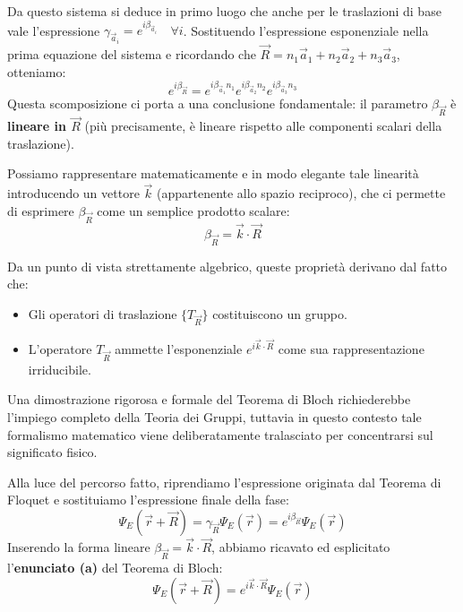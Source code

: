 Da questo sistema si deduce in primo luogo che anche per le traslazioni di base vale l'espressione \(\gamma_{\vec{a}_i} = e^{i\beta_{\vec{a}_i}} \quad \forall i\).
Sostituendo l'espressione esponenziale nella prima equazione del sistema e ricordando che \(\vec{R} = n_1\vec{a}_1 + n_2\vec{a}_2 + n_3\vec{a}_3\), otteniamo:
\begin{equation}
    e^{i\beta_{\vec{R}}} = e^{i\beta_{\vec{a}_1}n_1} e^{i\beta_{\vec{a}_2}n_2} e^{i\beta_{\vec{a}_3}n_3}
\end{equation}
Questa scomposizione ci porta a una conclusione fondamentale: il parametro \(\beta_{\vec{R}}\) è \textbf{lineare in \(\vec{R}\)} (più precisamente, è lineare rispetto alle componenti scalari della traslazione).

Possiamo rappresentare matematicamente e in modo elegante tale linearità introducendo un vettore \(\vec{k}\) (appartenente allo spazio reciproco), che ci permette di esprimere \(\beta_{\vec{R}}\) come un semplice prodotto scalare:
\begin{equation}
    \beta_{\vec{R}} = \vec{k} \cdot \vec{R}
\end{equation}
\begin{remark}
    Da un punto di vista strettamente algebrico, queste proprietà derivano dal fatto che:
    \begin{itemize}
        \item Gli operatori di traslazione \(\{T_{\vec{R}}\}\) costituiscono un gruppo.
        \item L'operatore \(T_{\vec{R}}\) ammette l'esponenziale \(e^{i\vec{k}\cdot\vec{R}}\) come sua rappresentazione irriducibile.
    \end{itemize}
    Una dimostrazione rigorosa e formale del Teorema di Bloch richiederebbe l'impiego completo della Teoria dei Gruppi, tuttavia in questo contesto tale formalismo matematico viene deliberatamente tralasciato per concentrarsi sul significato fisico.
\end{remark}

Alla luce del percorso fatto, riprendiamo l'espressione originata dal Teorema di Floquet e sostituiamo l'espressione finale della fase:
\begin{equation}
    \Psi_E(\vec{r} + \vec{R}) = \gamma_{\vec{R}} \Psi_E(\vec{r}) = e^{i\beta_{\vec{R}}} \Psi_E(\vec{r})
\end{equation}
Inserendo la forma lineare \(\beta_{\vec{R}} = \vec{k} \cdot \vec{R}\), abbiamo ricavato ed esplicitato l'\textbf{enunciato (a)} del Teorema di Bloch:
\begin{equation}
    \Psi_E(\vec{r} + \vec{R}) = e^{i\vec{k}\cdot\vec{R}} \Psi_E(\vec{r})
\end{equation}

